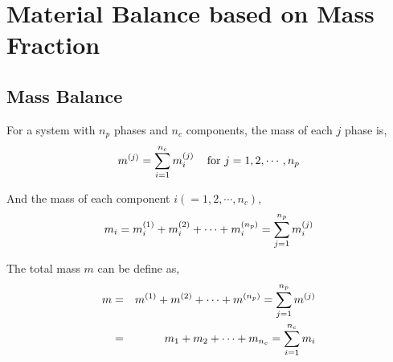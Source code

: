 

\chapter{Material Balance based on Mass Fraction}\label{Appendix:MaterialBalance}

\section{Mass Balance}\label{Appendix:ThermodynamicFormulation:Section:MassBalance}
For a system with $n_{p}$ phases and $n_{c}$ components, the mass of each $j$ phase is,
\begin{equation}
m^{(j)} = \summation_{i=1}^{n_{c}}\mfr[m]{i}{j}\;\;\;\text{ for }j=1,2,\cdots,n_{p}
\label{Appendix:MaterialBalance_Eqn_MassBalance_Phase}
\end{equation}

And the mass of each component $i\left(=1,2,\cdots,n_{c}\right)$,
\begin{equation}
m_{i} = m_{i}^{(1)} + m_{i}^{(2)} + \cdots + m_{i}^{\left(n_{p}\right)} = \summation_{j=1}^{n_{p}}\mfr[m]{i}{j}
\label{Appendix:MaterialBalance_Eqn_MassBalance_Component}
\end{equation}

The total mass $m$ can be define as,
\begin{eqnarray}
m & = & m^{(1)} + m^{(2)} + \cdots + m^{\left(n_{p}\right)} = \summation_{j=1}^{n_{p}}m^{(j)} \nonumber \\
  & = & m_{1} + m_{2} + \cdots + m_{n_{c}} = \summation_{i=1}^{n_{c}}m_{i} \nonumber 
\label{Appendix:MaterialBalance_Eqn_MassBalance_Mass}
\end{eqnarray}

